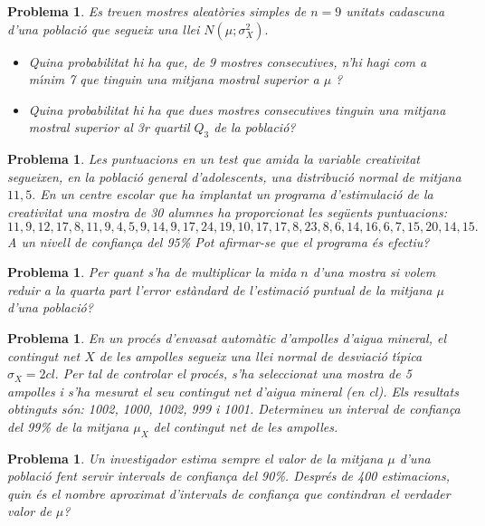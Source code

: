 \documentclass[11pt]{article}
\newcounter{prbcont}
\newtheorem{problema}[prbcont]{Problema}
\begin{document}
\begin{problema}
Es treuen mostres aleat\`ories simples de $n = 9$ unitats cadascuna d'una poblaci\'o que
segueix una llei $N(\mu; \sigma_X^2).$
\begin{itemize}
\item [(a)] Quina probabilitat hi ha que, de 9 mostres consecutives, n'hi hagi com a m\'{\i}nim
7 que tinguin una mitjana mostral superior a $\mu$ ? %
\item [(b)] Quina probabilitat hi ha que dues mostres consecutives tinguin una mitjana mostral
superior al 3r quartil $Q_3$ de la poblaci\'o? %
\end{itemize}
\end{problema}

\begin{problema}
Les puntuacions en un test que amida la variable creativitat segueixen, en la poblaci\'o general d'adolescents, una distribuci\'o normal de mitjana $11,5.$ En un centre escolar que ha implantat un programa d'estimulaci\'o de la creativitat una mostra de 30 alumnes ha proporcionat les seg\"uents puntuacions: 
\[11, 9, 12, 17, 8, 11, 9, 4, 5, 9, 14, 9, 17, 24, 19, 10, 17, 17, 8 , 23, 8, 6, 14, 16, 6, 7, 15, 20, 14, 15.\] 
A un nivell de confian\c{c}a del 95\% Pot afirmar-se que el programa \'es efectiu? 
\end{problema}



\begin{problema}
Per quant s'ha de multiplicar la mida $n$ d'una mostra si volem reduir a la quarta part
l'error est\`andard de l'estimaci\'o puntual de la mitjana $\mu$ d'una poblaci\'o? %
\end{problema}

\begin{problema}
En un proc\'es d'envasat autom\`atic d'ampolles d'aigua mineral, el contingut net $X$ de les
ampolles segueix una llei normal de desviaci\'o t\'{\i}pica $\sigma_X = 2 cl.$ Per tal de controlar
el proc\'es, s'ha seleccionat una mostra de 5 ampolles i s'ha mesurat el seu contingut
net d'aigua mineral (en cl). Els resultats obtinguts s\'on: 1002, 1000, 1002, 999 i 1001.
Determineu un interval de confian\c{c}a del 99\% de la mitjana $\mu_X$ del contingut net de les
ampolles. %
\end{problema}

\begin{problema}
Un investigador estima sempre el valor de la mitjana $\mu$ d'una poblaci\'o fent servir intervals
de confian\c{c}a del 90\%. Despr\'es de 400 estimacions, quin \'es el nombre aproximat
d'intervals de confian\c{c}a que contindran el verdader valor de $\mu$? %
\end{problema}
\end{document}
